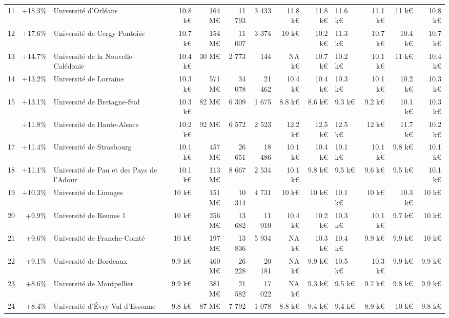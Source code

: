 \documentclass[12pt,french,landscape]{article}
\begin{document}
\begin{longtable}{rrlrrrrrrlrrr}
\addlinespace
\rowcolor{gray!6}  11 & +18.3\% & Université d'Orléans & 10.8 k€ & 164 M€ & 11 793 & 3 433 & 11.8 k€ & 11.8 k€ & 11.6 k€ & 11.1 k€ & 11 k€ & 10.8 k€\\
12 & +17.6\% & Université de Cergy-Pontoise & 10.7 k€ & 154 M€ & 11 007 & 3 374 & 10 k€ & 10.2 k€ & 11.3 k€ & 10.7 k€ & 10.4 k€ & 10.7 k€\\
\rowcolor{gray!6}  13 & +14.7\% & Université de la Nouvelle-Calédonie & 10.4 k€ & 30 M€ & 2 773 & 144 & NA k€ & 10.7 k€ & 10.2 k€ & 10.1 k€ & 11 k€ & 10.4 k€\\
14 & +13.2\% & Université de Lorraine & 10.3 k€ & 571 M€ & 34 078 & 21 462 & 10.4 k€ & 10.4 k€ & 10.3 k€ & 10.1 k€ & 10.2 k€ & 10.3 k€\\
\rowcolor{gray!6}  15 & +13.1\% & Université de Bretagne-Sud & 10.3 k€ & 82 M€ & 6 309 & 1 675 & 8.8 k€ & 8.6 k€ & 9.3 k€ & 9.2 k€ & 10.1 k€ & 10.3 k€\\
\addlinespace
16 & +11.8\% & Université de Haute-Alsace & 10.2 k€ & 92 M€ & 6 572 & 2 523 & 12.2 k€ & 12.5 k€ & 12.5 k€ & 12 k€ & 11.7 k€ & 10.2 k€\\
\rowcolor{gray!6}  17 & +11.4\% & Université de Strasbourg & 10.1 k€ & 457 M€ & 26 651 & 18 486 & 10.1 k€ & 10.4 k€ & 10.1 k€ & 10.1 k€ & 9.8 k€ & 10.1 k€\\
18 & +11.1\% & Université de Pau et des Pays de l'Adour & 10.1 k€ & 113 M€ & 8 667 & 2 534 & 10.1 k€ & 9.8 k€ & 9.5 k€ & 9.6 k€ & 9.5 k€ & 10.1 k€\\
\rowcolor{gray!6}  19 & +10.3\% & Université de Limoges & 10 k€ & 151 M€ & 10 314 & 4 731 & 10 k€ & 10 k€ & 10.1 k€ & 10 k€ & 10.3 k€ & 10 k€\\
20 & +9.9\% & Université de Rennes 1 & 10 k€ & 256 M€ & 13 682 & 11 910 & 10.4 k€ & 10.2 k€ & 10.3 k€ & 10.1 k€ & 9.7 k€ & 10 k€\\
\addlinespace
\rowcolor{gray!6}  21 & +9.6\% & Université de Franche-Comté & 10 k€ & 197 M€ & 13 836 & 5 934 & NA k€ & 10.3 k€ & 10.4 k€ & 9.9 k€ & 9.9 k€ & 10 k€\\
22 & +9.1\% & Université de Bordeaux & 9.9 k€ & 460 M€ & 26 228 & 20 181 & NA k€ & 9.9 k€ & 10.5 k€ & 10.3 k€ & 9.9 k€ & 9.9 k€\\
\rowcolor{gray!6}  23 & +8.6\% & Université de Montpellier & 9.9 k€ & 381 M€ & 21 582 & 17 022 & NA k€ & 9.3 k€ & 9.5 k€ & 9.7 k€ & 9.8 k€ & 9.9 k€\\
24 & +8.4\% & Université d'Évry-Val d'Essonne & 9.8 k€ & 87 M€ & 7 792 & 1 078 & 8.8 k€ & 9.4 k€ & 9.4 k€ & 8.9 k€ & 10 k€ & 9.8 k€\\

\end{longtable}
\end{document}
